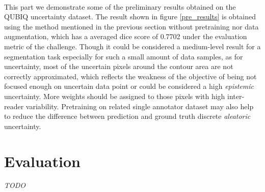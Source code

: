 \documentclass[12pt]{extarticle}
\begin{document}
\paragraph{}
This part we demonstrate some of the preliminary results obtained on the QUBIQ uncertainty dataset.
The result shown in figure \ref{pre_results} is obtained using the method mentioned in the previous 
section without pretraining nor data augmentation, which has 
a averaged dice score of 0.7702 under the evaluation metric of the challenge. 
Though it could be considered a medium-level result for a segmentation task especially for such
a small amount of data samples, as for uncertainty, most of the uncertain pixels around the contour area are not 
correctly approximated, which reflects the weakness of the objective of 
being not focused enough on uncertain data point or could be considered a high \textit{epistemic} uncertainty. 
More weights should be assigned to those pixels with high inter-reader variability. Pretraining on 
related single annotator dataset may also help to reduce the difference between 
prediction and ground truth discrete \textit{aleatoric} uncertainty.
\section{Evaluation}
\textit{TODO}




\end{document}
